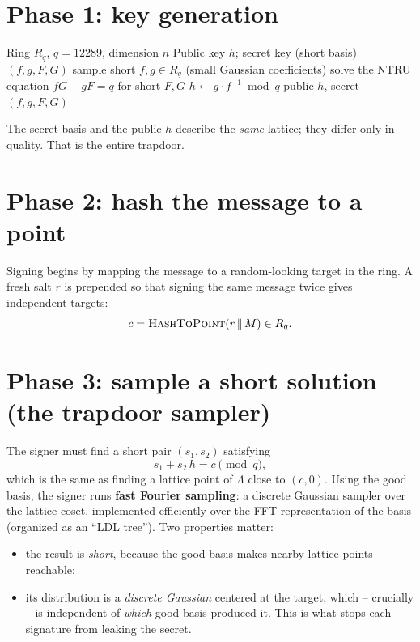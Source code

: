 \section{Phase 1: key generation}
\label{sec:falcon-keygen}

\begin{algorithm}[H]
\caption{FN-DSA.KeyGen (teaching form)}
\label{alg:fndsa-keygen}
\begin{algorithmic}[1]
\Require Ring $R_q$, $q=12289$, dimension $n$
\Ensure Public key $h$; secret key (short basis) $(f,g,F,G)$
\Repeat
  \State sample short $f, g \in R_q$ (small Gaussian coefficients)
\State solve the NTRU equation $fG - gF = q$ for short $F, G$
\State $h \gets g \cdot f^{-1} \bmod q$
\State \Return public $h$, secret $(f,g,F,G)$
\end{algorithmic}
\end{algorithm}

The secret basis and the public $h$ describe the \emph{same} lattice; they differ only in quality. That is the entire trapdoor.

\section{Phase 2: hash the message to a point}

Signing begins by mapping the message to a random-looking target in the ring. A fresh salt $r$ is prepended so that signing the same message twice gives independent targets:
\[
c = \textsc{HashToPoint}(r \,\|\, M) \in R_q.
\]

\section{Phase 3: sample a short solution (the trapdoor sampler)}
\label{sec:falcon-tree-note}

The signer must find a short pair $(s_1, s_2)$ satisfying
\[
s_1 + s_2\,h = c \pmod q,
\]
which is the same as finding a lattice point of $\Lambda$ close to $(c, 0)$. Using the good basis, the signer runs \textbf{fast Fourier sampling}: a discrete Gaussian sampler over the lattice coset, implemented efficiently over the FFT representation of the basis (organized as an ``LDL tree''). Two properties matter:

\begin{itemize}
  \item the result is \emph{short}, because the good basis makes nearby lattice points reachable;
  \item its distribution is a \emph{discrete Gaussian} centered at the target, which -- crucially -- is independent of \emph{which} good basis produced it. This is what stops each signature from leaking the secret.
\end{itemize}

